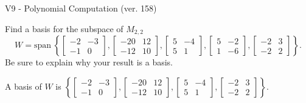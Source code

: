 \begin{exercise}
  \begin{exerciseTitle}V9 - Polynomial Computation (ver. 158)\end{exerciseTitle}
  \begin{exerciseStatement}
    Find a basis for the subspace of \(M_{2,2}\) 
\[W=\mathrm{span}\ \left\{\left[\begin{array}{cc}
-2 & -3 \\
-1 & 0
\end{array}\right] , \left[\begin{array}{cc}
-20 & 12 \\
-12 & 10
\end{array}\right] , \left[\begin{array}{cc}
5 & -4 \\
5 & 1
\end{array}\right] , \left[\begin{array}{cc}
5 & -2 \\
1 & -6
\end{array}\right] , \left[\begin{array}{cc}
-2 & 3 \\
-2 & 2
\end{array}\right]\right\}.\]
 Be sure to explain why your result is a basis.


  \end{exerciseStatement}
  \begin{exerciseAnswer}
   A basis of \(W\) is  \(\left\{\left[\begin{array}{cc}
-2 & -3 \\
-1 & 0
\end{array}\right] , \left[\begin{array}{cc}
-20 & 12 \\
-12 & 10
\end{array}\right] , \left[\begin{array}{cc}
5 & -4 \\
5 & 1
\end{array}\right] , \left[\begin{array}{cc}
-2 & 3 \\
-2 & 2
\end{array}\right]\right\}\).
  


  \end{exerciseAnswer}
\end{exercise}